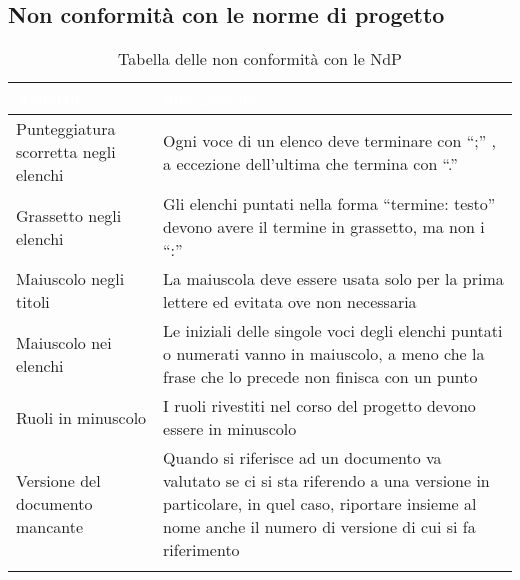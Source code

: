 \subsection{Non conformità con le norme di progetto}
{
    \setlength{\freewidth}{\dimexpr\textwidth-10\tabcolsep}
    \renewcommand{\arraystretch}{1.5}
    \centering
    \setlength{\aboverulesep}{0pt}
    \setlength{\belowrulesep}{0pt}
    \begin{longtable}{C{.5\freewidth} C{.5\freewidth}}
       \toprule
    \textcolor{white}{\textbf{Aspetto}}&
    \textcolor{white}{\textbf{Spiegazione}} \\
    \toprule
    \endhead
    Punteggiatura scorretta negli elenchi & Ogni voce di un elenco deve terminare con “;” , a eccezione dell'ultima che termina con “.” \\
    Grassetto negli elenchi & Gli elenchi puntati nella forma “termine: testo” devono avere il termine in grassetto, ma non i “:” \\
    Maiuscolo negli titoli & La maiuscola deve essere usata solo per la prima lettere ed evitata ove non necessaria \\
    Maiuscolo nei elenchi & Le iniziali delle singole voci degli elenchi puntati o numerati vanno in maiuscolo, a meno che la frase che lo precede non finisca con un punto \\
    Ruoli in minuscolo & I ruoli rivestiti nel corso del progetto devono essere in minuscolo \\
    Versione del documento mancante & Quando si riferisce ad un documento va valutato se ci si sta riferendo a una versione in particolare, in quel caso, riportare insieme al nome anche il numero di versione di cui si fa riferimento\\
    
    \bottomrule
    \caption{Tabella delle non conformità con le NdP}
\end{longtable}
}
